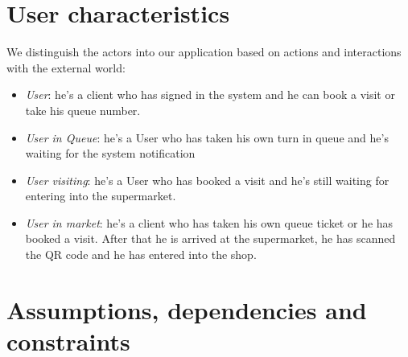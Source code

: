 \section{User characteristics}
We distinguish the actors into our application based on actions and interactions with the external world:

\begin{itemize}
\item \textit{User}: he’s a client who has signed in the system and he can book a visit or take his queue number.
\item \textit{User in Queue}: he’s a User who has taken his own turn in queue and he’s waiting for the system notification
\item \textit{User visiting}: he’s a User who has booked a visit and he’s still waiting for entering into the supermarket.
\item \textit{User in market}: he’s a client who has taken his own queue ticket or he has booked a visit. After that he is arrived at the supermarket, he has scanned the QR code and he has entered into the shop.
\end{itemize}


\section{Assumptions, dependencies and constraints}
